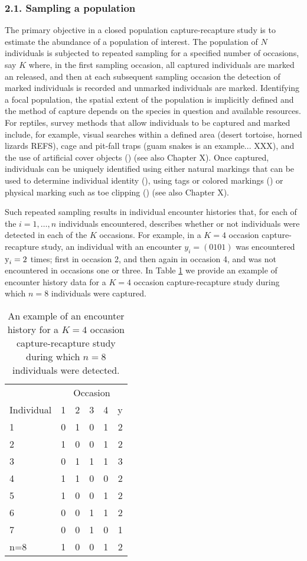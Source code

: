 \documentclass{book}
\begin{document}
\subsubsection*{2.1. Sampling a population}

The primary objective in a closed population capture-recapture study is
to estimate the abundance of a population of interest. The population
of $N$ individuals is subjected to repeated sampling for a specified
number of occasions, say $K$ where, in the first sampling occasion,
all captured individuals are marked an released, and then at each
subsequent sampling occasion the detection of marked individuals is
recorded and unmarked individuals are marked. Identifying a focal
population, the spatial extent of the population is implicitly defined
and the method of capture depends on the species in question and
available resources. For reptiles, survey methods that allow
individuals to be captured and marked include, for example, visual
searches within a defined area (desert tortoise, horned lizards REFS),
cage and pit-fall traps (guam snakes is an example... XXX), and the use of
artificial cover objects () (see also Chapter X). Once captured,
individuals can be uniquely identified using either natural markings
that can be used to determine individual identity (), using tags or
colored markings () or physical marking such as toe clipping () (see
also Chapter X).

Such repeated sampling results in individual encounter histories that,
for each of the $i=1,\ldots,n$ individuals encountered, describes
whether or not individuals were detected in each of the $K$
occasions. For example, in a $K = 4$ occasion capture-recapture study,
an individual with an encounter $y_i = (0 1 0 1)$ was encountered
$\hbox{y}_i = 2$ times; first in occasion 2, and then again in
occasion 4, and was not encountered in occasions one or three. In
Table \ref{enchist} we provide an example of encounter history data
for a $K=4$ occasion capture-recapture study during which $n=8$
individuals were captured.

\begin{table}[h]
  \centering
  \caption{An example of an encounter history for a $K = 4$ occasion capture-recapture study during which $n=8$ individuals were detected.}
  \label{enchist}
 \begin{tabular}{lccccr}
 \hline
    &\multicolumn{5}{c}{Occasion} \\
  Individual & 1 & 2 & 3 & 4 & y\\
 \hline
  1   & 0 & 1 & 0 & 1 & 2 \\
  2   & 1 & 0 & 0 & 1 & 2 \\
  3   & 0 & 1 & 1 & 1 & 3 \\
  4   & 1 & 1 & 0 & 0 & 2 \\
  5   & 1 & 0 & 0 & 1 & 2 \\
  6   & 0 & 0 & 1 & 1 & 2 \\
  7   & 0 & 0 & 1 & 0 & 1 \\
  n=8 & 1 & 0 & 0 & 1 & 2 \\
 \hline
 \end{tabular}
\end{table}
\end{document}
